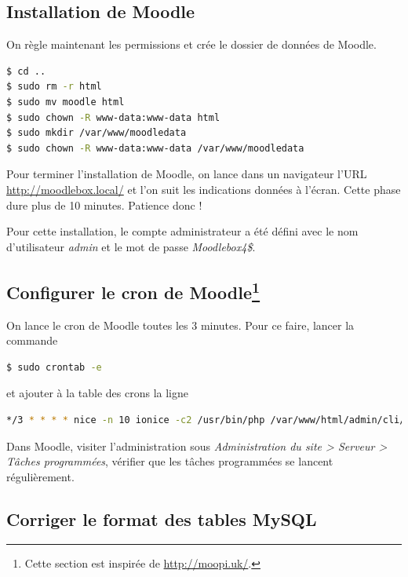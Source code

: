 \documentclass[11pt]{article}
\begin{document}
\subsection{Installation de Moodle}

On règle maintenant les permissions et crée le dossier de données de Moodle.
\begin{lstlisting}[language=bash]
$ cd ..
$ sudo rm -r html
$ sudo mv moodle html
$ sudo chown -R www-data:www-data html
$ sudo mkdir /var/www/moodledata
$ sudo chown -R www-data:www-data /var/www/moodledata
\end{lstlisting}

Pour terminer l'installation de Moodle, on lance dans un navigateur l'URL \url{http://moodlebox.local/} et l'on suit les indications données à l'écran. Cette phase dure plus de 10 minutes. Patience donc !

Pour cette installation, le compte administrateur a été défini avec le nom d'utilisateur \emph{admin} et le mot de passe \emph{Moodlebox4\$}.

\subsection[Configurer le cron de Moodle]{Configurer le cron de Moodle\footnote{Cette section est inspirée de \url{http://moopi.uk/}.}}

On lance le cron de Moodle toutes les 3 minutes. Pour ce faire, lancer la commande

\begin{lstlisting}[language=bash]
$ sudo crontab -e
\end{lstlisting}

et ajouter à la table des crons la ligne
\begin{lstlisting}[language=bash]
*/3 * * * * nice -n 10 ionice -c2 /usr/bin/php /var/www/html/admin/cli/cron.php
\end{lstlisting}

\begin{verification}
Dans Moodle, visiter l'administration sous \emph{Administration du site > Serveur > Tâches programmées}, vérifier que les tâches programmées se lancent régulièrement.
\end{verification}

\subsection{Corriger le format des tables MySQL}
\end{document}
